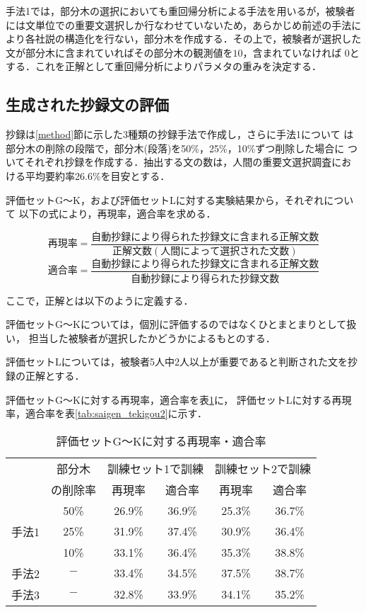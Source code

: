 手法1では，部分木の選択においても重回帰分析による手法を用いるが，被験者
には文単位での重要文選択しか行なわせていないため，あらかじめ前述の手法に
より各社説の構造化を行ない，部分木を作成する．その上で，被験者が選択した
文が部分木に含まれていればその部分木の観測値を$10$，含まれていなければ
$0$とする．これを正解として重回帰分析によりパラメタの重みを決定する．

\subsection{生成された抄録文の評価}

抄録は\ref{method}節に示した3種類の抄録手法で作成し，さらに手法1について
は部分木の削除の段階で，部分木(段落)を50\%，25\%，10\%ずつ削除した場合に
ついてそれぞれ抄録を作成する．抽出する文の数は，人間の重要文選択調査にお
ける平均要約率26.6\%を目安とする．

評価セットG〜K，および評価セットLに対する実験結果から，それぞれについて
以下の式により，再現率，適合率を求める．

{\small
\[
 再現率 = \frac{自動抄録により得られた抄録文に含まれる正解文数}{正解文数(人間によって選択された文数)}
\]
\[
 適合率 = \frac{自動抄録により得られた抄録文に含まれる正解文数}{自動抄録により得られた抄録文数}
\]
}


ここで，正解とは以下のように定義する．

評価セットG〜Kについては，個別に評価するのではなくひとまとまりとして扱い，
担当した被験者が選択したかどうかによるもとのする．

評価セットLについては，被験者5人中2人以上が重要であると判断された文を抄
録の正解とする．

評価セットG〜Kに対する再現率，適合率を表\ref{tab:saigen_tekigou1}に，
評価セットLに対する再現率，適合率を表\ref{tab:saigen_tekigou2}に示す．

{\footnotesize
\begin{table}[hbtp]
 \begin{center}
  \tabcolsep=5mm
  \begin{tabular}{|c|c||c|c|c|c|} \hline
         & 部分木   & \multicolumn{2}{|c|}{訓練セット1で訓練} & \multicolumn{2}{c|}{訓練セット2で訓練} \\ \cline{3-6}
         & の削除率 & 再現率 & 適合率 & 再現率 & 適合率 \\ \hline \hline
         & 50\%     & 26.9\% & 36.9\% & 25.3\% & 36.7\% \\ \cline{2-6}
   手法1 & 25\%     & 31.9\% & 37.4\% & 30.9\% & 36.4\% \\ \cline{2-6}
         & 10\%     & 33.1\% & 36.4\% & 35.3\% & 38.8\% \\ \hline
   手法2 &  $-$     & 33.4\% & 34.5\% & 37.5\% & 38.7\% \\ \hline
   手法3 &  $-$     & 32.8\% & 33.9\% & 34.1\% & 35.2\% \\ \hline
  \end{tabular}
 \end{center}
  \caption{評価セットG〜Kに対する再現率・適合率}
  \label{tab:saigen_tekigou1}
\end{table}
}

